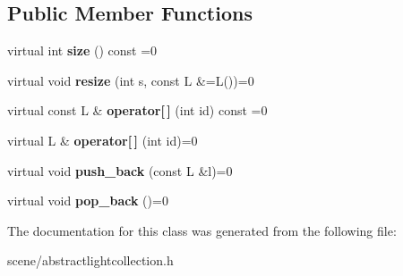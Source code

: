 \subsection*{Public Member Functions}
\begin{DoxyCompactItemize}
\item 
\hypertarget{class_tempest_1_1_abstract_light_collection_1_1_pack_abe6481b5bba8362b29540fd97bd560b4}{virtual int {\bfseries size} () const =0}\label{class_tempest_1_1_abstract_light_collection_1_1_pack_abe6481b5bba8362b29540fd97bd560b4}

\item 
\hypertarget{class_tempest_1_1_abstract_light_collection_1_1_pack_a05aa7342aedfdedcd0b6e7f1a1cbd210}{virtual void {\bfseries resize} (int s, const L \&=L())=0}\label{class_tempest_1_1_abstract_light_collection_1_1_pack_a05aa7342aedfdedcd0b6e7f1a1cbd210}

\item 
\hypertarget{class_tempest_1_1_abstract_light_collection_1_1_pack_a1c9fc8bce1957218765cb2303ca38511}{virtual const L \& {\bfseries operator\mbox{[}$\,$\mbox{]}} (int id) const =0}\label{class_tempest_1_1_abstract_light_collection_1_1_pack_a1c9fc8bce1957218765cb2303ca38511}

\item 
\hypertarget{class_tempest_1_1_abstract_light_collection_1_1_pack_a8d8a97109281d990b96d1e02cbad09aa}{virtual L \& {\bfseries operator\mbox{[}$\,$\mbox{]}} (int id)=0}\label{class_tempest_1_1_abstract_light_collection_1_1_pack_a8d8a97109281d990b96d1e02cbad09aa}

\item 
\hypertarget{class_tempest_1_1_abstract_light_collection_1_1_pack_a13caad2f3073de975d97b971f3bd6231}{virtual void {\bfseries push\+\_\+back} (const L \&l)=0}\label{class_tempest_1_1_abstract_light_collection_1_1_pack_a13caad2f3073de975d97b971f3bd6231}

\item 
\hypertarget{class_tempest_1_1_abstract_light_collection_1_1_pack_a52ba9636f260b66e739e21fcfac6d26f}{virtual void {\bfseries pop\+\_\+back} ()=0}\label{class_tempest_1_1_abstract_light_collection_1_1_pack_a52ba9636f260b66e739e21fcfac6d26f}

\end{DoxyCompactItemize}


The documentation for this class was generated from the following file\+:\begin{DoxyCompactItemize}
\item 
scene/abstractlightcollection.\+h\end{DoxyCompactItemize}
